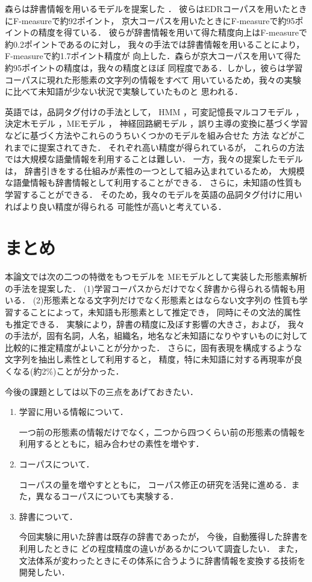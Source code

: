 森らは辞書情報を用いるモデルを提案した \cite{Mori:98}．
彼らはEDRコーパスを用いたときにF-measureで約92ポイント，
京大コーパスを用いたときにF-measureで約95ポイントの精度を得ている．
彼らが辞書情報を用いて得た精度向上はF-measureで約0.2ポイントであるのに対し，
我々の手法では辞書情報を用いることにより，F-measureで約1.7ポイント精度が
向上した．森らが京大コーパスを用いて得た約95ポイントの精度は，我々の精度とほぼ
同程度である．しかし，彼らは学習コーパスに現れた形態素の文字列の情報をすべて
用いているため，我々の実験に比べて未知語が少ない状況で実験していたものと
思われる．

英語では，品詞タグ付けの手法として，
HMM \cite{Cutting:92}，可変記憶長マルコフモデル \cite{Schutze:94}，
決定木モデル \cite{Daelemans:96}，MEモデル \cite{ratnaparkhi:emnlp96}，
神経回路網モデル \cite{Schmid:94}，誤り主導の変換に基づく学習 \cite{Brill:95}
などに基づく方法やこれらのうちいくつかのモデルを組み合せた
方法 \cite{Marquez:97,Halteren:98} などがこれまでに提案されてきた．
それぞれ高い精度が得られているが，
これらの方法では大規模な語彙情報を利用することは難しい．
一方，我々の提案したモデルは，
辞書引きをする仕組みが素性の一つとして組み込まれているため，
大規模な語彙情報も辞書情報として利用することができる．
さらに，未知語の性質も学習することができる．
そのため，我々のモデルを英語の品詞タグ付けに用いればより良い精度が得られる
可能性が高いと考えている．

\section{まとめ}
\label{sec:conclusion}

本論文では次の二つの特徴をもつモデルを
MEモデルとして実装した形態素解析の手法を提案した．
(1)学習コーパスからだけでなく辞書から得られる情報も用いる．
(2)形態素となる文字列だけでなく形態素とはならない文字列の
性質も学習することによって，未知語も形態素として推定でき，
同時にその文法的属性も推定できる．
実験により，辞書の精度に及ぼす影響の大きさ，および，
我々の手法が，固有名詞，人名，組織名，地名など未知語になりやすいものに対して
比較的に推定精度がよいことが分かった．
さらに，固有表現を構成するような文字列を抽出し素性として利用すると，
精度，特に未知語に対する再現率が良くなる(約2\%)ことが分かった．

今後の課題としては以下の三点をあげておきたい．
\begin{enumerate}
\item 学習に用いる情報について．

一つ前の形態素の情報だけでなく，二つから四つくらい前の形態素の情報を
利用するとともに，組み合わせの素性を増やす．

\item コーパスについて．

コーパスの量を増やすとともに，
コーパス修正の研究を活発に進める．また，異なるコーパスについても実験する．
\item 辞書について．

今回実験に用いた辞書は既存の辞書であったが，
今後，自動獲得した辞書を利用したときに
どの程度精度の違いがあるかについて調査したい．
また，
文法体系が変わったときにその体系に合うように辞書情報を変換する技術を
開発したい．
\end{enumerate}

